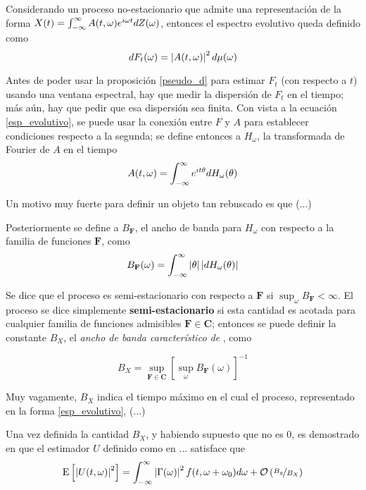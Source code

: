 Considerando un proceso no-estacionario \xt que admite una representación de la forma 
$X(t) = \int_{-\infty}^{\infty} A(t,\omega) e^{i \omega t} dZ(\omega)$, entonces el espectro evolutivo queda definido 
como
\begin{equation}
dF_t(\omega) = \left| A(t,\omega) \right|^{2} d\mu(\omega)
\label{esp_evolutivo}
\end{equation}

Antes de poder usar la proposición \ref{pseudo_d} para estimar $F_t$ (con respecto a $t$) usando 
una ventana espectral, hay que medir la dispersión de $F_t$ en el tiempo; más aún, hay que pedir 
que esa dispersión sea finita.
Con vista a la ecuación \ref{esp_evolutivo}, se puede usar la conexión entre $F$ y $A$ para 
establecer condiciones respecto a la segunda; se define entonces a $H_\omega$, la transformada de
Fourier de $A$ en el tiempo
\begin{equation}
A(t,\omega) = \int_{-\infty}^{\infty} e^{i t \theta} dH_\omega(\theta)
\end{equation}

Un motivo muy fuerte para definir un objeto tan rebuscado es que (...)

Posteriormente se define a $B_{\mathbf{F}}$, el ancho de banda para $H_\omega$ con respecto a la 
familia de funciones $\mathbf{F}$, como
%
\begin{equation}
B_{\mathbf{F}}(\omega) = \int_{-\infty}^{\infty} \left| \theta \right| \left| dH_\omega(\theta) \right|
\end{equation}

Se dice que el proceso es semi-estacionario con respecto a $\mathbf{F}$ si 
$\sup_\omega B_{\mathbf{F}} < \infty$. El proceso se dice simplemente \textbf{semi-estacionario} 
si esta cantidad es acotada para cualquier familia de funciones admisibles 
$\mathbf{F} \in \mathbf{C}$; entonces se puede definir la constante $B_X$, el \textit{ancho de 
banda característico de} \xt, como

\begin{equation}
B_X = \sup_{\mathbf{F}\in \mathbf{C}} \left[ \sup_\omega B_{\mathbf{F}}(\omega) \right]^{-1}
\end{equation}

Muy vagamente, $B_X$ indica el tiempo máximo en el cual el proceso, representado en la forma
\ref{esp_evolutivo}, (...)

Una vez definida la cantidad $B_X$, y habiendo supuesto que no es 0, es demostrado en 
\cite{Priestley65} que el estimador $U$ definido como en ... satisface que
%
\begin{equation}
\mathrm{E}\left[ \left| U(t,\omega) \right|^{2} \right] = \int_{-\infty}^{\infty} \left| \Gamma(\omega) \right|^{2} f(t,\omega+\omega_0) d\omega
+ \mathcal{O}\left( \nicefrac{B_g}{B_X} \right)
\end{equation}


